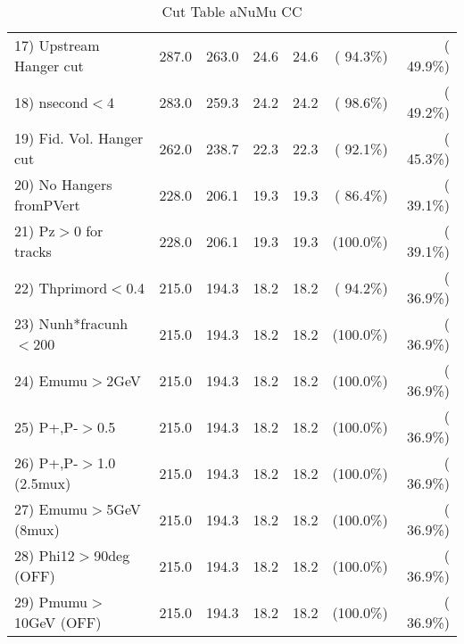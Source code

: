 \begin{table}[h!]
\begin{tabular}{||l||r|r|r|r|r|r||}
 17) Upstream Hanger cut  &        287.0 &        263.0 &         24.6 &         24.6 & ( 94.3\%) & ( 49.9\%) \\
 18) nsecond$<$4          &        283.0 &        259.3 &         24.2 &         24.2 & ( 98.6\%) & ( 49.2\%) \\
 19) Fid. Vol. Hanger cut &        262.0 &        238.7 &         22.3 &         22.3 & ( 92.1\%) & ( 45.3\%) \\
 20) No Hangers fromPVert &        228.0 &        206.1 &         19.3 &         19.3 & ( 86.4\%) & ( 39.1\%) \\
 21) Pz$>$0 for tracks    &        228.0 &        206.1 &         19.3 &         19.3 & (100.0\%) & ( 39.1\%) \\
 22) Thprimord$<$0.4      &        215.0 &        194.3 &         18.2 &         18.2 & ( 94.2\%) & ( 36.9\%) \\
 23) Nunh*fracunh$<$200   &        215.0 &        194.3 &         18.2 &         18.2 & (100.0\%) & ( 36.9\%) \\
 24) Emumu$>$2GeV         &        215.0 &        194.3 &         18.2 &         18.2 & (100.0\%) & ( 36.9\%) \\
 25) P+,P-$>$0.5          &        215.0 &        194.3 &         18.2 &         18.2 & (100.0\%) & ( 36.9\%) \\
 26) P+,P-$>$1.0 (2.5mux) &        215.0 &        194.3 &         18.2 &         18.2 & (100.0\%) & ( 36.9\%) \\
 27) Emumu$>$5GeV  (8mux) &        215.0 &        194.3 &         18.2 &         18.2 & (100.0\%) & ( 36.9\%) \\
 28) Phi12$>$90deg  (OFF) &        215.0 &        194.3 &         18.2 &         18.2 & (100.0\%) & ( 36.9\%) \\
 29) Pmumu$>$10GeV  (OFF) &        215.0 &        194.3 &         18.2 &         18.2 & (100.0\%) & ( 36.9\%) \\
 \hline
 \hline
 \end{tabular}
 \caption{Cut Table  aNuMu CC }
 \label{tab-cutcohjpsi-mumu_anumucc}
 \end{table}
